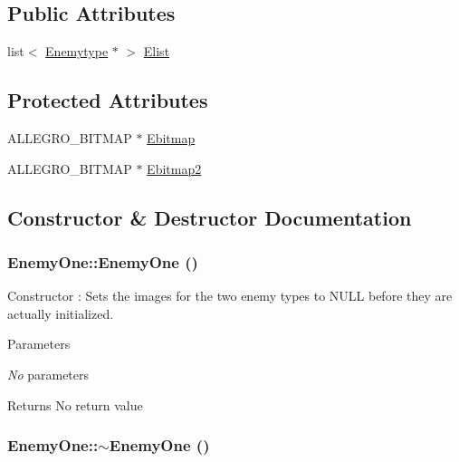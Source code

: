 \subsection*{Public Attributes}
\begin{DoxyCompactItemize}
\item 
list$<$ \hyperlink{classEnemytype}{Enemytype} $\ast$ $>$ \hyperlink{classEnemyOne_a1e46e43f2fe68dad65a79d57671159b6}{Elist}
\end{DoxyCompactItemize}
\subsection*{Protected Attributes}
\begin{DoxyCompactItemize}
\item 
ALLEGRO\_\-BITMAP $\ast$ \hyperlink{classEnemyOne_a186a44174a5f8c35d805209c1806d967}{Ebitmap}
\item 
ALLEGRO\_\-BITMAP $\ast$ \hyperlink{classEnemyOne_ab42c5298a1849dd5a422dfaa1dc0f459}{Ebitmap2}
\end{DoxyCompactItemize}


\subsection{Constructor \& Destructor Documentation}
\hypertarget{classEnemyOne_a876b7dc33899c1627a0ee1e08b34baf8}{
\subsubsection[{EnemyOne}]{\setlength{\rightskip}{0pt plus 5cm}EnemyOne::EnemyOne ()}}
\label{classEnemyOne_a876b7dc33899c1627a0ee1e08b34baf8}


Constructor : Sets the images for the two enemy types to NULL before they are actually initialized. 
\begin{DoxyParams}{Parameters}
\item[{\em No}]parameters \end{DoxyParams}
\begin{DoxyReturn}{Returns}
No return value 
\end{DoxyReturn}
\hypertarget{classEnemyOne_ad7999ae2c8228030d3f07df562a5aa0a}{
\subsubsection[{$\sim$EnemyOne}]{\setlength{\rightskip}{0pt plus 5cm}EnemyOne::$\sim$EnemyOne ()}}
\label{classEnemyOne_ad7999ae2c8228030d3f07df562a5aa0a}


